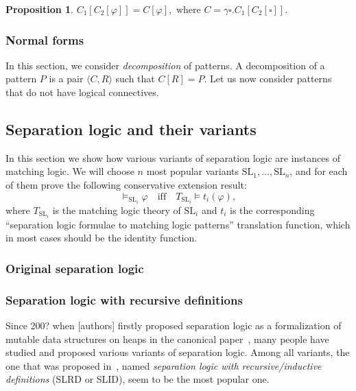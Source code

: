 \documentclass{article}
\theoremstyle{plain}
\newtheorem{prop}[thm]{Proposition}
\begin{document}
\begin{prop}
	$C_1[C_2[\varphi]] = C [\varphi], \text{ where } C = \gamma \square . C_1[C_2[\square]].$
\end{prop}

\subsubsection{Normal forms}

In this section, we consider \emph{decomposition} of patterns. A decomposition of a pattern $P$ is a pair $\langle C, R \rangle $ such that $C[R] = P$. Let us now consider patterns that do not have logical connectives.

\subsection{Separation logic and their variants}

In this section we show how various variants of separation logic are instances of matching logic. We will choose $n$ most popular variants $\mathrm{SL}_1, \dots, \mathrm{SL}_n$, and for each of them prove the following conservative extension result:
\begin{equation*}
\vDash_{\mathrm{SL}_i} \varphi \quad \text{iff} \quad T_{\mathrm{SL}_i} \vDash t_i(\varphi),
\end{equation*}
where $T_{\mathrm{SL}_i}$ is the matching logic theory of $\mathrm{SL}_i$ and $t_i$ is the corresponding ``separation logic formulae to matching logic patterns''  translation function, which in most cases should be the identity function.

\subsubsection{Original separation logic}

\subsubsection{Separation logic with recursive definitions}

Since 200? when [authors] firstly proposed separation logic as a formalization 
of mutable data structures on heaps in the canonical paper~\cite{}, many people 
have studied and proposed various variants of separation logic. 
Among all variants, the one that was proposed in~\cite{}, named 
\emph{separation logic with recursive/inductive definitions} (SLRD or SLID), 
seem to be the most popular one. 
\end{document}
